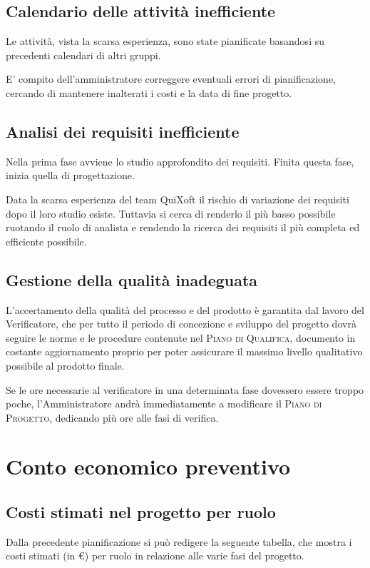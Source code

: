 \documentclass[11pt,a4paper]{article}
\begin{document}
\subsection{Calendario delle attività inefficiente}
Le attività, vista la scarsa esperienza, sono state pianificate basandosi su precedenti calendari di altri gruppi.

E' compito dell'amministratore correggere eventuali errori di pianificazione, cercando di mantenere inalterati i costi e la data di fine progetto.
\subsection{Analisi dei requisiti inefficiente}
Nella prima fase avviene lo studio approfondito dei requisiti.
Finita questa fase, inizia quella di progettazione.

Data la scarsa esperienza del team QuiXoft il rischio di variazione dei requisiti dopo il loro studio esiste. Tuttavia si cerca di renderlo il più basso possibile ruotando il ruolo di analista e rendendo la ricerca dei requisiti il più completa ed efficiente possibile.
\subsection{Gestione della qualità inadeguata}
L'accertamento della qualità del processo e del prodotto è garantita dal lavoro del Verificatore, che per tutto il periodo di concezione e sviluppo del progetto dovrà seguire le norme e le procedure contenute nel \textsc{Piano di Qualifica}, documento in costante aggiornamento proprio per poter assicurare il massimo livello qualitativo possibile al prodotto finale.

Se le ore necessarie al verificatore in una determinata fase dovessero essere troppo poche, l'Amministratore andrà immediatamente a modificare il \textsc{Piano di Progetto}, dedicando più ore alle fasi di verifica.
\section{Conto economico preventivo}
\subsection{Costi stimati nel progetto per ruolo}
Dalla precedente pianificazione si può redigere la seguente tabella, che mostra i costi stimati (in \euro) per ruolo in relazione alle varie fasi del progetto.
\end{document}
